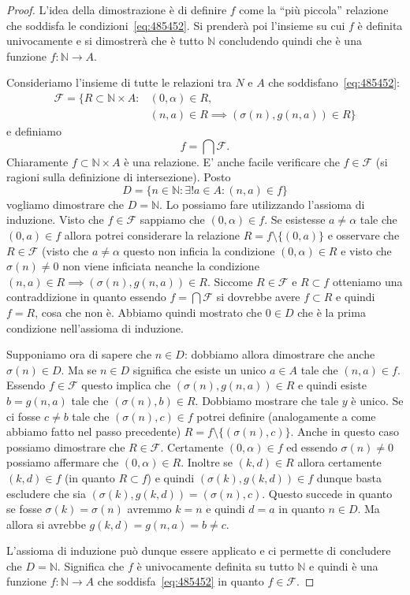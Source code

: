 \documentclass[italian,a4paper,hidelinks,headinclude]{scrartcl}
\newcommand{\NN}{{\mathbb N}}
\begin{document}
\begin{proof}
L'idea della dimostrazione è di definire $f$ come la ``più piccola'' relazione
che soddisfa le condizioni~\eqref{eq:485452}. Si prenderà poi l'insieme su cui $f$
è definita univocamente e si dimostrerà che è tutto $\NN$ concludendo quindi
che è una funzione $f\colon \NN \to A$.

Consideriamo l'insieme di tutte le relazioni tra $N$ e $A$
che soddisfano~\eqref{eq:485452}:
\begin{align*}
\mathcal F = \{ R\subset \NN \times A \colon &(0,\alpha)\in R,\\
  &(n,a)\in R \implies (\sigma(n),g(n,a))\in R \}
\end{align*}
e definiamo
\[
  f = \bigcap \mathcal F.
\]
Chiaramente $f\subset \NN\times A$ è una relazione.
E' anche facile verificare che $f\in \mathcal F$ (si ragioni sulla
definizione di intersezione).
Posto
\[
  D = \{ n\in \NN\colon \exists! a\in A\colon (n,a)\in f \}
\]
vogliamo dimostrare che $D=\NN$.
Lo possiamo fare utilizzando l'assioma di induzione.
Visto che $f\in \mathcal F$ sappiamo che $(0,\alpha)\in f$.
Se esistesse $a\neq \alpha$ tale che $(0,a)\in f$ allora potrei considerare la
relazione $R = f \setminus \{(0,a)\}$ e osservare che $R\in \mathcal F$
(visto che $a\neq \alpha$ questo non inficia la condizione $(0,\alpha)\in R$ e
visto che $\sigma(n)\neq 0$ non viene inficiata neanche la condizione
$(n,a)\in R \implies (\sigma(n),g(n,a))\in R$.
Siccome $R\in \mathcal F$
e $R\subset f$ otteniamo una contraddizione in quanto essendo $f=\bigcap \mathcal F$
si dovrebbe avere $f\subset R$ e quindi $f=R$, cosa che non è.
Abbiamo quindi mostrato che $0\in D$ che è la prima condizione nell'assioma di induzione.

Supponiamo ora di sapere che $n\in D$: dobbiamo allora dimostrare che anche
$\sigma(n)\in D$. Ma se $n\in D$ significa che esiste un unico $a\in A$ tale che
$(n,a)\in f$. Essendo $f\in \mathcal F$ questo implica che $(\sigma(n),g(n,a))\in R$
e quindi esiste $b=g(n,a)$ tale che $(\sigma(n),b)\in R$. Dobbiamo mostrare
che tale $y$ è unico. Se ci fosse $c\neq b$ tale che $(\sigma(n),c)\in f$ potrei
definire (analogamente a come abbiamo fatto nel passo precedente)
$R=f\setminus\{(\sigma(n),c)\}$. Anche in questo caso possiamo dimostrare
che $R\in \mathcal F$.
Certamente $(0,\alpha)\in f$ ed essendo $\sigma(n)\neq 0$ possiamo
affermare che $(0,\alpha)\in R$.
Inoltre se $(k,d)\in R$ allora certamente $(k,d)\in f$ (in quanto $R\subset f$)
e quindi $(\sigma(k),g(k,d))\in f$ dunque basta escludere che sia
$(\sigma(k),g(k,d)) = (\sigma(n),c)$.
Questo succede in quanto se fosse $\sigma(k)=\sigma(n)$ avremmo $k=n$
e quindi $d=a$ in quanto $n\in D$. Ma allora si avrebbe $g(k,d)=g(n,a)=b\neq c$.

L'assioma di induzione può dunque essere applicato e ci permette di concludere
che $D=\NN$. Significa che $f$ è univocamente definita su tutto $\NN$ e quindi
è una funzione $f\colon \NN \to A$ che soddisfa~\eqref{eq:485452} in
quanto $f\in \mathcal F$.
\end{proof}
\end{document}
